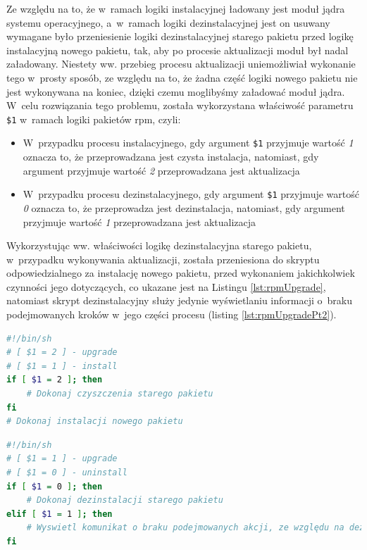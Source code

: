 Ze względu na to, że w~ramach logiki instalacyjnej ładowany jest moduł jądra systemu operacyjnego, a~w~ramach logiki dezinstalacyjnej jest on usuwany wymagane było przeniesienie logiki dezinstalacyjnej starego pakietu przed logikę instalacyjną nowego pakietu, tak, aby po procesie aktualizacji moduł był nadal załadowany. Niestety ww. przebieg procesu aktualizacji uniemożliwiał wykonanie tego w~prosty sposób, ze względu na to, że żadna część logiki nowego pakietu nie jest wykonywana na koniec, dzięki czemu moglibyśmy załadować moduł jądra. W~celu rozwiązania tego problemu, została wykorzystana właściwość parametru \lstinline{$1} w~ramach logiki pakietów \gls*{rpm}, czyli:
\begin{itemize}
\item W~przypadku procesu instalacyjnego, gdy argument \lstinline{$1} przyjmuje wartość \textit{1} oznacza to, że przeprowadzana jest czysta instalacja, natomiast, gdy argument przyjmuje wartość \textit{2} przeprowadzana jest aktualizacja
\item W~przypadku procesu dezinstalacyjnego, gdy argument \lstinline{$1} przyjmuje wartość \textit{0} oznacza to, że przeprowadza jest dezinstalacja, natomiast, gdy argument przyjmuje wartość \textit{1} przeprowadzana jest aktualizacja
\end{itemize}

Wykorzystując ww. właściwości logikę dezinstalacyjna starego pakietu, w~przypadku wykonywania aktualizacji, została przeniesiona do skryptu odpowiedzialnego za instalację nowego pakietu, przed wykonaniem jakichkolwiek czynności jego dotyczących, co ukazane jest na Listingu \ref{lst:rpmUpgrade}, natomiast skrypt dezinstalacyjny służy jedynie wyświetlaniu informacji o~braku podejmowanych kroków w~jego części procesu (listing \ref{lst:rpmUpgradePt2}).

\newpage
\begin{lstlisting}[language=bash, caption={Przykład wykorzystania właściwości argumentów dla skryptu \textit{post-install}}, label={lst:rpmUpgrade}]
#!/bin/sh
# [ $1 = 2 ] - upgrade
# [ $1 = 1 ] - install
if [ $1 = 2 ]; then
    # Dokonaj czyszczenia starego pakietu
fi
# Dokonaj instalacji nowego pakietu
\end{lstlisting}

\begin{lstlisting}[language=bash, caption={Przykład wykorzystania właściwości argumentów dla skryptu \textit{pre-uninstall}}, label={lst:rpmUpgradePt2}]
#!/bin/sh
# [ $1 = 1 ] - upgrade
# [ $1 = 0 ] - uninstall
if [ $1 = 0 ]; then
    # Dokonaj dezinstalacji starego pakietu
elif [ $1 = 1 ]; then
    # Wyswietl komunikat o braku podejmowanych akcji, ze względu na dezinstalację wykonaną przez skrypt post-install
fi

\end{lstlisting}

